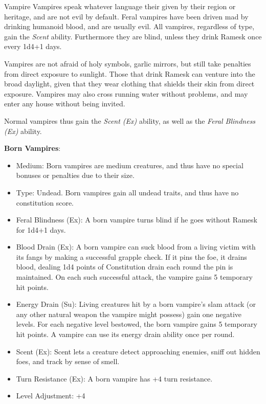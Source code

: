 \begin{35e}{Vampire}
  Vampires speak whatever language their given by their region or heritage,
  and are not evil by default. Feral vampires have been driven mad by drinking
  humanoid blood, and are usually evil. All vampires, regardless of type, gain
  the \emph{Scent} ability. Furthermore they are blind, unless they drink
  Ramesk once every 1d4+1 days.

  Vampires are not afraid of holy symbols, garlic mirrors, but still take
  penalties from direct exposure to sunlight. Those that drink Ramesk can
  venture into the broad daylight, given that they wear clothing that shields
  their skin from direct exposure. Vampires may also cross running water
  without problems, and may enter any house without being invited.

  Normal vampires thus gain the \emph{Scent (Ex)} ability, as well as the
  \emph{Feral Blindness (Ex)} ability.

  \textbf{Born Vampires}:\\
  \begin{itemize}[noitemsep]
    \item Medium: Born vampires are medium creatures, and thus have no special
      bonuses or penalties due to their size.
    \item Type: Undead. Born vampires gain all undead traits, and thus have no
      constitution score.
    \item Feral Blindness (Ex): A born vampire turns blind if he goes without
      Ramesk for 1d4+1 days.
    \item Blood Drain (Ex): A born vampire can suck blood from a living victim
      with its fangs by making a successful grapple check. If it pins the foe,
      it drains blood, dealing 1d4 points of Constitution drain each round the
      pin is maintained. On each such successful attack, the vampire gains 5
      temporary hit points.
    \item Energy Drain (Su): Living creatures hit by a born vampire's slam
      attack (or any other natural weapon the vampire might possess) gain one
      negative levels. For each negative level bestowed, the born vampire
      gains 5 temporary hit points. A vampire can use its energy drain ability
      once per round.
    \item Scent (Ex): Scent lets a creature detect approaching enemies, sniff
      out hidden foes, and track by sense of smell.
    \item Turn Resistance (Ex): A born vampire has +4 turn resistance.
    \item Level Adjustment: +4
  \end{itemize}
\end{35e}
